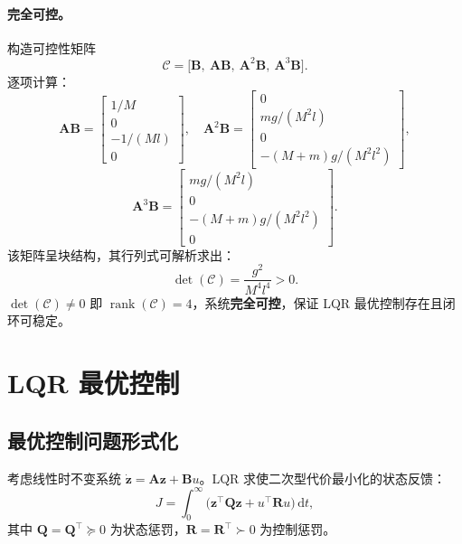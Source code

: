 \documentclass[11pt,a4paper]{article}
\begin{document}
\paragraph{完全可控。} 构造可控性矩阵
\begin{equation}
    \mathcal C = \big[\mathbf B,\ \mathbf A\mathbf B,\ \mathbf A^2\mathbf B,\ \mathbf A^3\mathbf B\big] .
\end{equation}
逐项计算：
\begin{equation}
    \mathbf A\mathbf B = \begin{bmatrix} 1/M \\ 0 \\ -1/(Ml) \\ 0 \end{bmatrix},
    \quad
    \mathbf A^2\mathbf B = \begin{bmatrix} 0 \\ mg/(M^2 l) \\ 0 \\ -(M+m)g/(M^2 l^2) \end{bmatrix},
\end{equation}
\begin{equation}
    \mathbf A^3\mathbf B = \begin{bmatrix} mg/(M^2 l) \\ 0 \\ -(M+m)g/(M^2 l^2) \\ 0 \end{bmatrix} .
\end{equation}
该矩阵呈块结构，其行列式可解析求出：
\begin{equation}
    \det(\mathcal C) = \frac{g^2}{M^4 l^4} > 0 .
\end{equation}
$\det(\mathcal C) \neq 0$ 即 $\operatorname{rank}(\mathcal C) = 4$，系统\textbf{完全可控}，保证 LQR 最优控制存在且闭环可稳定。

\section{LQR 最优控制}

\subsection{最优控制问题形式化}

考虑线性时不变系统 $\dot{\mathbf z} = \mathbf A\mathbf z + \mathbf B u$。LQR 求使二次型代价最小化的状态反馈：
\begin{equation}
    J = \int_0^{\infty} \big(\mathbf z^{\top}\mathbf Q \mathbf z + u^{\top}\mathbf R u\big)\,\mathrm dt ,
    \label{eq:cost}
\end{equation}
其中 $\mathbf Q = \mathbf Q^{\top} \succeq 0$ 为状态惩罚，$\mathbf R = \mathbf R^{\top} \succ 0$ 为控制惩罚。
\end{document}
